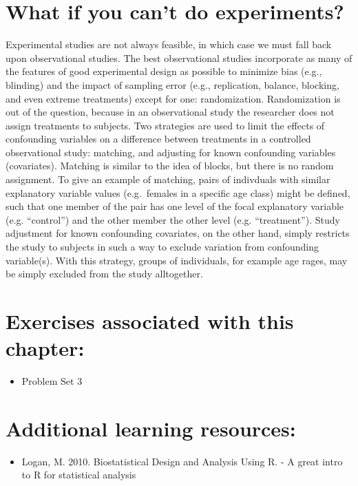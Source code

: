 \documentclass[]{book}
\providecommand{\tightlist}{%
  \setlength{\itemsep}{0pt}\setlength{\parskip}{0pt}}
\begin{document}
\hypertarget{what-if-you-cant-do-experiments}{%
\section{What if you can't do experiments?}\label{what-if-you-cant-do-experiments}}

Experimental studies are not always feasible, in which case we must fall back upon observational studies. The best observational studies incorporate as many of the features of good experimental design as possible to minimize bias (e.g., blinding) and the impact of sampling error (e.g., replication, balance, blocking, and even extreme treatments) except for one: randomization. Randomization is out of the question, because in an observational study the researcher does not assign treatments to subjects. Two strategies are used to limit the effects of confounding variables on a difference between treatments in a controlled observational study: matching, and adjusting for known confounding variables (covariates). Matching is similar to the idea of blocks, but there is no random assignment. To give an example of matching, pairs of indivduals with similar explanatory variable values (e.g.~females in a specific age class) might be defined, such that one member of the pair has one level of the focal explanatory variable (e.g. ``control'') and the other member the other level (e.g. ``treatment''). Study adjustment for known confounding covariates, on the other hand, simply restricts the study to subjects in such a way to exclude variation from confounding variable(s). With this strategy, groups of individuals, for example age rages, may be simply excluded from the study alltogether.

\hypertarget{exercises-associated-with-this-chapter-5}{%
\section{Exercises associated with this chapter:}\label{exercises-associated-with-this-chapter-5}}

\begin{itemize}
\tightlist
\item
  Problem Set 3
\end{itemize}

\hypertarget{additional-learning-resources-5}{%
\section{Additional learning resources:}\label{additional-learning-resources-5}}

\begin{itemize}
\tightlist
\item
  Logan, M. 2010. Biostatistical Design and Analysis Using R. - A great intro to R for statistical analysis
\end{itemize}


\end{document}
